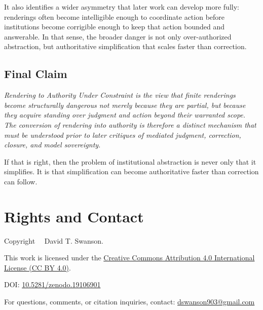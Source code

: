 \documentclass[11pt]{article}
\renewenvironment{quote}
  {\list{}{\leftmargin=1.4em \rightmargin=1.0em}%
   \item\relax\color{softink}\itshape}
  {\endlist}
\renewcommand{\emph}[1]{\textit{#1}}
\begin{document}
It also identifies a wider asymmetry that later work can develop more fully: renderings often become intelligible enough to coordinate action before institutions become corrigible enough to keep that action bounded and answerable. In that sense, the broader danger is not only over-authorized abstraction, but authoritative simplification that scales faster than correction.

\subsection{Final Claim}

\begin{quote}
\emph{Rendering to Authority Under Constraint} is the view that finite renderings become structurally dangerous not merely because they are partial, but because they acquire standing over judgment and action beyond their warranted scope. The conversion of rendering into authority is therefore a distinct mechanism that must be understood prior to later critiques of mediated judgment, correction, closure, and model sovereignty.
\end{quote}

If that is right, then the problem of institutional abstraction is never only that it simplifies. It is that simplification can become authoritative faster than correction can follow.



\section*{Rights and Contact}

\noindent
Copyright \textcopyright\ \the\year\ David T. Swanson.

\noindent
This work is licensed under the
\href{https://creativecommons.org/licenses/by/4.0/}
{Creative Commons Attribution 4.0 International License (CC BY 4.0)}.

\noindent
DOI:
\href{https://doi.org/10.5281/zenodo.19106901}{10.5281/zenodo.19106901}

\noindent
For questions, comments, or citation inquiries, contact:
\href{mailto:dswanson903@gmail.com}{dswanson903@gmail.com}
\end{document}
